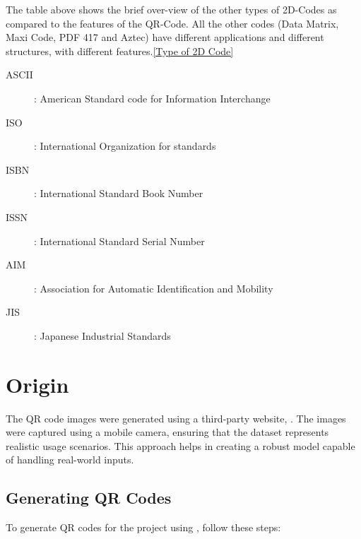 The table above shows the brief over-view of the other types of 2D-Codes as compared to the features of the QR-Code. All the other codes (Data Matrix, Maxi Code, PDF 417 and Aztec) have different applications and different structures, with different features.\ref{Type of 2D Code}

\begin{description}
	\item[ASCII]: American Standard code for Information Interchange
	\item[ISO]: International Organization for standards
	\item[ISBN]: International Standard Book Number
	\item[ISSN]: International Standard Serial Number
	\item [AIM]: Association for Automatic Identification and Mobility
	\item[JIS]: Japanese Industrial Standards
\end{description}


\section{Origin}

The QR code images were generated using a third-party website,  . The images were captured using a mobile camera, ensuring that the dataset represents realistic usage scenarios. This approach helps in creating a robust model capable of handling real-world inputs.

\subsection{Generating QR Codes}

To generate QR codes for the project using , follow these steps:

